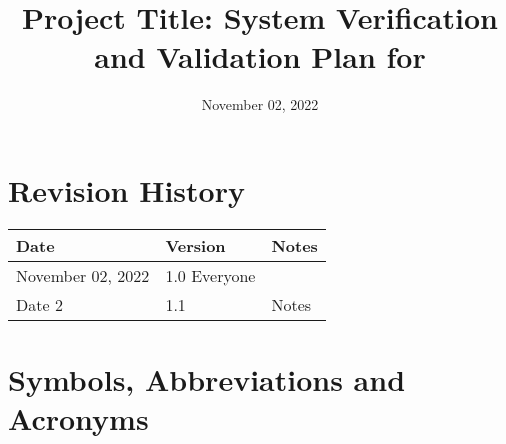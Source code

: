 \documentclass[12pt]{article}
\begin{document}
\title{Project Title: System Verification and Validation Plan for \progname{}} 
\author{\authname}

\date{November 02, 2022}

	
\maketitle


\newpage

\tableofcontents

\listoftables

\newpage

\section{Revision History}

\begin{tabularx}{\textwidth}{p{3cm}p{2cm}X}
\toprule {\bf Date} & {\bf Version} & {\bf Notes}\\
\midrule
November 02, 2022 & 1.0 Everyone\\
Date 2 & 1.1 & Notes\\
\bottomrule
\end{tabularx}

\newpage

\section{Symbols, Abbreviations and Acronyms}
\end{document}
